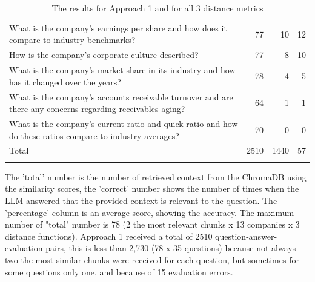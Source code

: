 \begin{longtable}{L{0.6\textwidth}rrr}
What is the company's earnings per share and how does it compare to industry benchmarks? & 77 & 10 & 12 \\
How is the company's corporate culture described? & 77 & 8 & 10 \\
What is the company's market share in its industry and how has it changed over the years? & 78 & 4 & 5 \\
What is the company's accounts receivable turnover and are there any concerns regarding receivables aging? & 64 & 1 & 1 \\
What is the company's current ratio and quick ratio and how do these ratios compare to industry averages? & 70 & 0 & 0 \\
\hline
Total & 2510 & 1440 & 57 \\
\hline
\caption{The results for Approach 1 and for all 3 distance metrics} \\
\end{longtable}

The 'total' number is the number of retrieved context from the ChromaDB using the similarity scores, the 'correct' number shows the number of times when the LLM answered that the provided context is relevant to the question. The 'percentage' column is an average score, showing the accuracy. The maximum number of "total" number is 78 (2 the most relevant chunks x 13 companies x 3 distance functions). Approach 1 received a total of 2510 question-answer-evaluation pairs, this is less than 2,730 (78 x 35 questions) because not always two the most similar chunks were received for each question, but sometimes for some questions only one, and because of 15 evaluation errors. 

